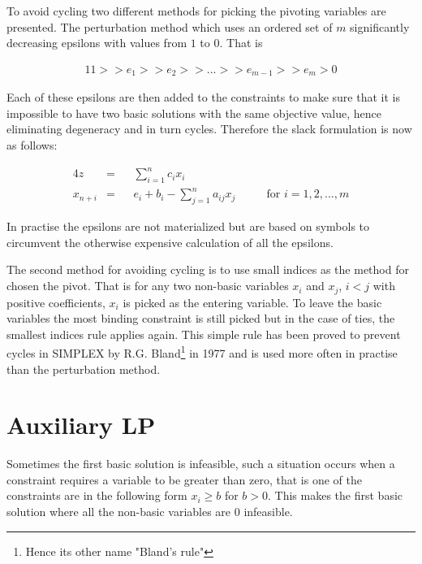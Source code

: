 
To avoid cycling two different methods for picking the pivoting variables are presented. The perturbation method which uses an ordered set of $m$ significantly decreasing epsilons with values from $1$ to $0$. That is 

\begin{alignat}{1}
1 >> e_1 >> e_2 >> ... >> e_{m-1} >> e_m > 0
\end{alignat}

Each of these epsilons are then added to the constraints to make sure that it is impossible to have two basic solutions with the same objective value, hence eliminating degeneracy and in turn cycles. Therefore the slack formulation is now as follows:

\begin{alignat}{4}
z        &= && \sum_{i=1}^{n} c_ix_i\\
x_{n+i}  &= && e_i+b_i - \sum_{j=1}^{n} a_{ij} x_j  &&& \text{ for } i=1,2,...,m
\end{alignat}

In practise the epsilons are not materialized but are based on symbols to circumvent the otherwise expensive calculation of all the epsilons.

The second method for avoiding cycling is to use small indices as the method for chosen the pivot. That is for any two non-basic variables $x_i$ and $x_j$, $i < j$ with positive coefficients, $x_i$ is picked as the entering variable. To leave the basic variables the most binding constraint is still picked but in the case of ties, the smallest indices rule applies again. This simple rule has been proved to prevent cycles in SIMPLEX by R.G. Bland\footnote{Hence its other name "Bland's rule"} in 1977 and is used more often in practise than the perturbation method.

\section{Auxiliary LP}
Sometimes the first basic solution is infeasible, such a situation occurs when a constraint requires a variable to be greater than zero, that is one of the constraints are in the following form $x_i \geq b $ for  $ b > 0 $. This makes the first basic solution where all the non-basic variables are $0$ infeasible. 

